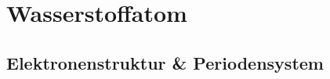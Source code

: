 \section{Wasserstoffatom}%
\label{wass:sec:wasserstoffatom}

\subsection{Elektronenstruktur \& Periodensystem}%
\label{wass:sub:elektronenstruktur_periodensystem}
